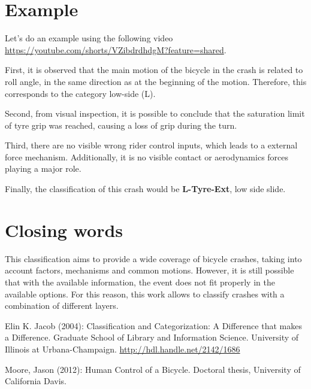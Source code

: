 \documentclass{article}
\begin{document}
\section{Example}

Let's do an example using the following video \url{https://youtube.com/shorts/VZibdrdhdgM?feature=shared}.

First, it is observed that the main motion of the bicycle in the crash is related to roll angle, in the same direction as at the beginning of the motion.
%
Therefore, this corresponds to the category low-side (L).


Second, from visual inspection, it is possible to conclude that the saturation limit of tyre grip was reached, causing a loss of grip during the turn.


Third, there are no visible wrong rider control inputs, which leads to a external force mechanism.
%
Additionally, it is no visible contact or aerodynamics forces playing a major role.


Finally, the classification of this crash would be \textbf{L-Tyre-Ext}, low side slide.


\section{Closing words}

This classification aims to provide a wide coverage of bicycle crashes, taking into account factors, mechanisms and common motions.
%
However, it is still possible that with the available information, the event does not fit properly in the available options.
%
For this reason, this work allows to classify crashes with a combination of different layers.



\begin{thebibliography}{9}

     Elin K. Jacob (2004):  Classification and Categorization: A Difference that makes a Difference. Graduate School of Library and Information Science. University of Illinois at Urbana-Champaign. \url{http://hdl.handle.net/2142/1686}

     Moore, Jason (2012): Human Control of a Bicycle. Doctoral thesis, University of California Davis.


\end{thebibliography}
\end{document}
